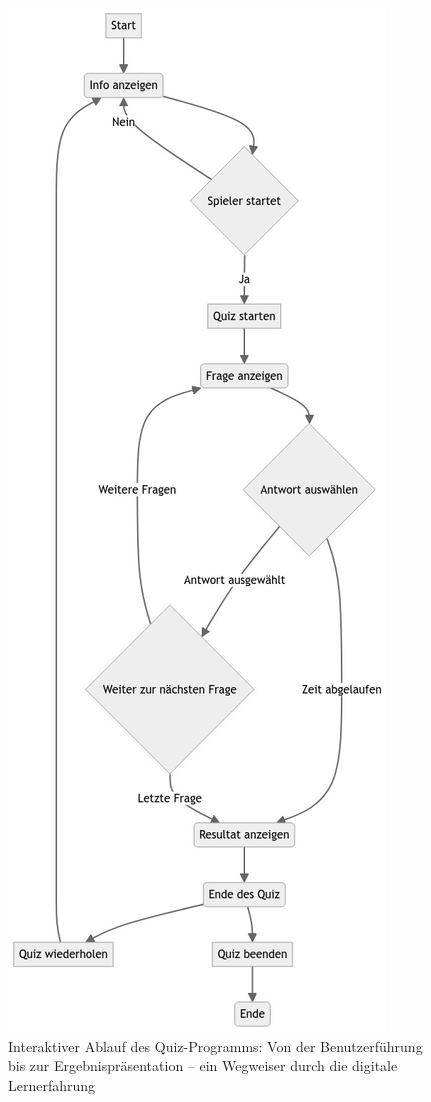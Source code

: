 \documentclass[10pt, fleqn]{scrartcl}
\begin{document}
\begin{figure}[h!]
	\centering
	\includegraphics[scale=0.4]{flowcharts/flowchart1.png}
	\caption{Interaktiver Ablauf des Quiz-Programms: Von der Benutzerführung bis zur Ergebnispräsentation – ein Wegweiser durch die digitale Lernerfahrung}
	\label{fig:main-logic}
\end{figure}
\end{document}
